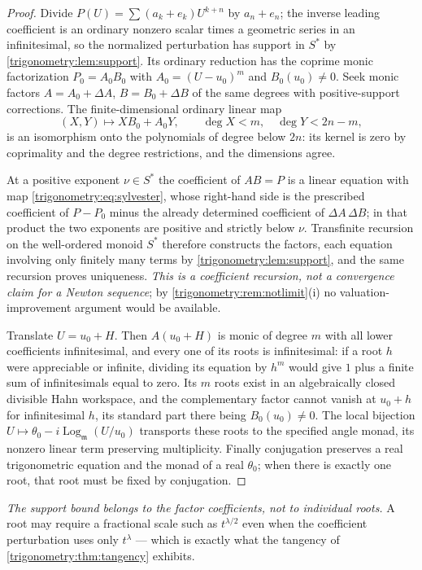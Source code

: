 \documentclass[11pt,letterpaper]{article}
\numberwithin{equation}{section}
\theoremstyle{definition}
\theoremstyle{remark}
\newcommand{\mm}{\mathfrak m}
\newcommand{\Logm}{\operatorname{Log}_{\mm}}
\begin{document}
\begin{proof}
Divide $P(U)=\sum(a_k+e_k)U^{k+n}$ by $a_n+e_n$; the inverse leading coefficient is an ordinary
nonzero scalar times a geometric series in an infinitesimal, so the normalized perturbation has
support in $S^*$ by \cref{trigonometry:lem:support}. Its ordinary reduction has the coprime monic
factorization $P_0=A_0B_0$ with $A_0=(U-u_0)^m$ and $B_0(u_0)\ne0$. Seek monic factors
$A=A_0+\Delta A$, $B=B_0+\Delta B$ of the same degrees with positive-support corrections. The
finite-dimensional ordinary linear map
\begin{equation}\label{trigonometry:eq:sylvester}
 (X,Y)\longmapsto XB_0+A_0Y,\qquad \deg X<m,\quad\deg Y<2n-m,
\end{equation}
is an isomorphism onto the polynomials of degree below $2n$: its kernel is zero by coprimality and
the degree restrictions, and the dimensions agree.

At a positive exponent $\nu\in S^*$ the coefficient of $AB=P$ is a linear equation with map
\cref{trigonometry:eq:sylvester}, whose right-hand side is the prescribed coefficient of $P-P_0$
minus the already determined coefficient of $\Delta A\,\Delta B$; in that product the two exponents
are positive and strictly below $\nu$. Transfinite recursion on the well-ordered monoid $S^*$
therefore constructs the factors, each equation involving only finitely many terms by
\cref{trigonometry:lem:support}, and the same recursion proves uniqueness. \emph{This is a
coefficient recursion, not a convergence claim for a Newton sequence}; by
\cref{trigonometry:rem:notlimit}(i) no valuation-improvement argument would be available.

Translate $U=u_0+H$. Then $A(u_0+H)$ is monic of degree $m$ with all lower coefficients
infinitesimal, and every one of its roots is infinitesimal: if a root $h$ were appreciable or
infinite, dividing its equation by $h^m$ would give $1$ plus a finite sum of infinitesimals equal
to zero. Its $m$ roots exist in an algebraically closed divisible Hahn workspace, and the
complementary factor cannot vanish at $u_0+h$ for infinitesimal $h$, its standard part there being
$B_0(u_0)\ne0$. The local bijection $U\mapsto\theta_0-i\Logm(U/u_0)$ transports these roots to the
specified angle monad, its nonzero linear term preserving multiplicity. Finally conjugation
preserves a real trigonometric equation and the monad of a real $\theta_0$; when there is exactly
one root, that root must be fixed by conjugation.
\end{proof}
\emph{The support bound belongs to the factor coefficients, not to individual roots.} A root may
require a fractional scale such as $t^{\lambda/2}$ even when the coefficient perturbation uses only
$t^\lambda$ --- which is exactly what the tangency of \cref{trigonometry:thm:tangency} exhibits.
\end{document}
